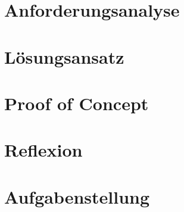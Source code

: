 \documentclass[
11pt, %
a4paper, %
BCOR10mm, %
DIV14, %
footsepline = false, %
headsepline, %
oneside, %
openright,
halfparskip, %
abstracton, %
listof=totocnumbered, %
bibliography=totocnumbered %
]{scrreprt}
\begin{document}
  \chapter{Anforderungsanalyse}\label{chap:anforderungen}
  
  
  \chapter{Lösungsansatz}\label{chap:loesungsansatz}
  
  
  \chapter{Proof of Concept}\label{chap:proof_of_concept}
  
  
  \chapter{Reflexion}\label{chap:reflexion}
  
  
  \appendix
  
  \chapter{Aufgabenstellung}\label{chap:aufgabenstellung}
  
  
  
  
  
  \listoffigures
  \listoftables
  
  
  
\end{document}
